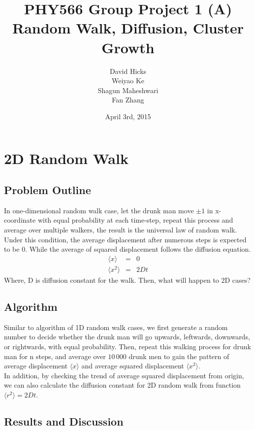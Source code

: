\documentclass[a4paper,12pt]{article}
\begin{document}
\title{PHY566 Group Project 1 (A) \\ Random Walk, Diffusion, Cluster Growth}
\date{\small April 3rd, 2015}
\author{David Hicks\\ Weiyao Ke \\ Shagun Maheshwari \\ Fan Zhang}

\maketitle
\section{2D Random Walk}
\subsection{Problem Outline}
In one-dimensional random walk case, let the drunk man move $\pm 1$ in x-coordinate with equal probability at each time-step, repeat this process and average over multiple walkers, the result is the universal law of random walk. Under this condition, the average displacement after numerous steps is expected to be $0$. While the average of squared displacement follows the diffusion equation.
\begin{eqnarray*}
\langle x \rangle &=& 0 \\
\langle x^2 \rangle &=& 2Dt
\end{eqnarray*}
Where, D is diffusion constant for the walk. Then, what will happen to 2D cases? \\

\subsection{Algorithm}
Similar to algorithm of 1D random walk cases, we first generate a random number to decide whether the drunk man will go upwards, leftwards, downwards, or rightwards, with equal probability. Then, repeat this walking process for drunk man for n steps, and average over $10\,000$ drunk men to gain the pattern of average displacement $\langle x \rangle$ and average squared displacement $\langle x^2 \rangle$. \\
In addition, by checking the trend of average squared displacement from origin, we can also calculate the diffusion constant for 2D random walk from function $\langle r^2 \rangle = 2Dt$.

\subsection{Results and Discussion}
\end{document}
